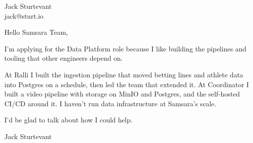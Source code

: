 \documentclass[11pt]{article}
\begin{document}
\raggedright

{\namefont\fontsize{20pt}{24pt}\selectfont Jack Sturtevant}\\[-0.3em]
jack@sturt.io

\vspace{1.2em}

Hello Samsara Team,

I'm applying for the Data Platform role because I like building the pipelines and tooling that other engineers depend on.

At Ralli I built the ingestion pipeline that moved betting lines and athlete data into Postgres on a schedule, then led the team that extended it. At Coordinator I built a video pipeline with storage on MinIO and Postgres, and the self-hosted CI/CD around it. I haven't run data infrastructure at Samsara's scale.

I'd be glad to talk about how I could help.

\vspace{0.6em}
Jack Sturtevant
\end{document}
